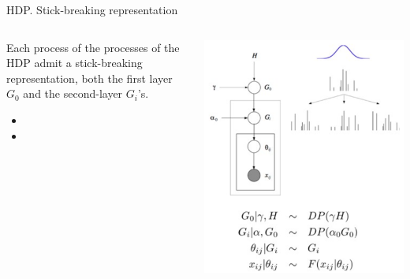 \begin{frame}{HDP. Stick-breaking representation}
	\begin{columns}
	\begin{column}{0.5\textwidth}
   	Each process of the processes of the HDP admit a stick-breaking representation, both the first layer $G_0$ and the second-layer $G_i$'s.\pause
	
	\begin{itemize}[<+->]
		\item {}
		\item 	{}
	\end{itemize}
\end{column}
\begin{column}{0.5\textwidth}
    \begin{center}
     \includegraphics[width=\textwidth]{figures_julyan/beyond_DP/HDP}
     \end{center}
\end{column}
\end{columns}
\end{frame}

